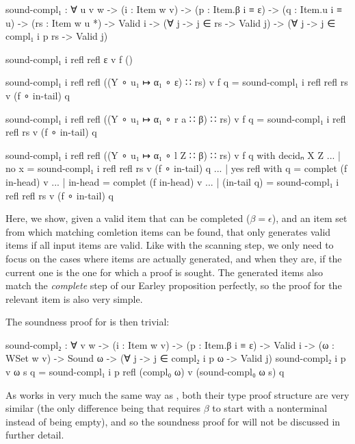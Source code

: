 		\begin{code}

			sound-compl₁ : ∀ {u v w} ->
			  (i : Item w v) ->
			  (p : Item.β i ≡ ε) ->
			  (q : Item.u i ≡ u) ->
			  (rs : Item w u *) ->
			  Valid i -> (∀ {j} -> j ∈ rs -> Valid j) ->
			  (∀ {j} -> j ∈ compl₁ i p rs -> Valid j)

			sound-compl₁ i refl refl ε v f ()

			sound-compl₁ i refl refl ((Y ∘ u₁ ↦ α₁ ∘ ε) ∷ rs) v f q = 
			  sound-compl₁ i refl refl rs v (f ∘ in-tail) q

			sound-compl₁ i refl refl ((Y ∘ u₁ ↦ α₁ ∘ r a ∷ β) ∷ rs) v f q = 
			  sound-compl₁ i refl refl rs v (f ∘ in-tail) q

			sound-compl₁ i refl refl ((Y ∘ u₁ ↦ α₁ ∘ l Z ∷ β) ∷ rs) v f q with decidₙ X Z
			... | no x = sound-compl₁ i refl refl rs v (f ∘ in-tail) q
			... | yes refl with q = complet (f in-head) v
			...            | in-head     = complet (f in-head) v
			...            | (in-tail q) = sound-compl₁ i refl refl rs v (f ∘ in-tail) q

		\end{code}
		
		Here, we show, given a valid item that can be completed ($\beta =
		\epsilon$), and an item set from which matching comletion items can be 
		found, that  only generates valid items if all input 
		items are valid. Like with the scanning step, we only need to focus on 
		the cases where items are actually generated, and when they are, if the 
		current one is the one for which a proof is sought. The generated items
		also match the \emph{complete} step of our Earley proposition 
		perfectly, so the proof for the relevant item is also very simple.

		The soundness proof for  is then trivial:
		
		\begin{code}

			sound-compl₂ : ∀ {v w} ->
			  (i : Item w v) ->
			  (p : Item.β i ≡ ε) ->
			  Valid i -> (ω : WSet w v) -> Sound ω ->
			  (∀ {j} -> j ∈ compl₂ i p ω -> Valid j)
			sound-compl₂ i p v ω s q =
			  sound-compl₁ i p refl (compl₀ ω) v (sound-compl₀ ω s) q

		\end{code}
		
		As  works in very much the same way as
		, both their type proof structure are very similar (the
		only difference being that  requires $\beta$ to start
		with a nonterminal instead of being empty), and so the soundness proof
		for  will not be discussed in further detail.
		
